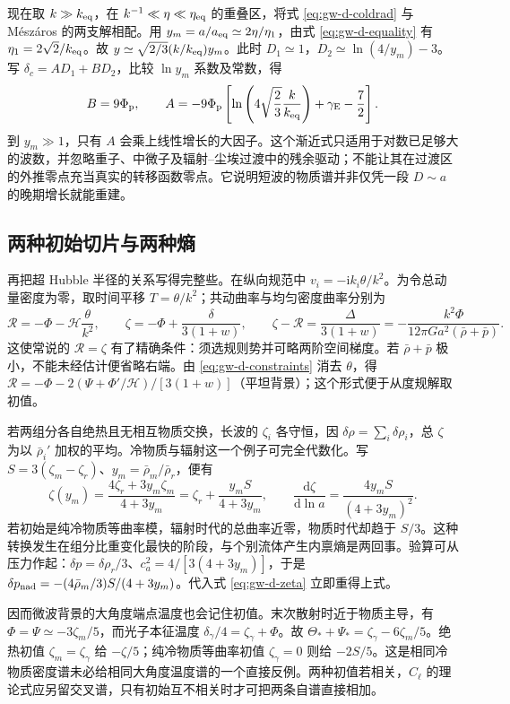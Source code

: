 现在取 $k\gg k_{\rm eq}$，在 $k^{-1}\ll\eta\ll\eta_{\rm eq}$ 的重叠区，将式 \eqref{eq:gw-d-coldrad} 与 Mészáros 的两支解相配。用 $y_m=a/a_{\rm eq}\simeq2\eta/\eta_1$，由式 \eqref{eq:gw-d-equality} 有 $\eta_1=2\sqrt2/k_{\rm eq}$。故 $y\simeq\sqrt{2/3}(k/k_{\rm eq})y_m$。此时 $D_1\simeq1$，$D_2\simeq\ln(4/y_m)-3$。写 $\delta_c=A D_1+B D_2$，比较 $\ln y_m$ 系数及常数，得
\[
 B=9\Phi_{\rm p},\qquad
 A=-9\Phi_{\rm p}
   \left[\ln\left(4\sqrt{\frac23}\frac{k}{k_{\rm eq}}\right)
   +\gamma_{\rm E}-\frac72\right].
\]
到 $y_m\gg1$，只有 $A$ 会乘上线性增长的大因子。这个渐近式只适用于对数已足够大的波数，并忽略重子、中微子及辐射--尘埃过渡中的残余驱动；不能让其在过渡区的外推零点充当真实的转移函数零点。它说明短波的物质谱并非仅凭一段 $D\sim a$ 的晚期增长就能重建。

\subsection{两种初始切片与两种熵}

再把超 Hubble 半径的关系写得完整些。在纵向规范中 $v_i=-\mathrm i k_i\theta/k^2$。为令总动量密度为零，取时间平移 $T=\theta/k^2$；共动曲率与均匀密度曲率分别为
\[
 \mathcal R=-\Phi-\mathcal H\frac{\theta}{k^2},\qquad
 \zeta=-\Phi+\frac{\delta}{3(1+w)},\qquad
 \zeta-\mathcal R=\frac{\Delta}{3(1+w)}
 =-\frac{k^2\Phi}{12\pi G a^2(\bar\rho+\bar p)} .
\]
这使常说的 $\mathcal R=\zeta$ 有了精确条件：须选规则势并可略两阶空间梯度。若 $\bar\rho+\bar p$ 极小，不能未经估计便省略右端。由 \eqref{eq:gw-d-constraints} 消去 $\theta$，得 $\mathcal R=-\Phi-2(\Psi+\Phi'/\mathcal H)/[3(1+w)]$（平坦背景）；这个形式便于从度规解取初值。

若两组分各自绝热且无相互物质交换，长波的 $\zeta_i$ 各守恒，因 $\delta\rho=\sum_i\delta\rho_i$，总 $\zeta$ 为以 $\bar\rho_i'$ 加权的平均。冷物质与辐射这一个例子可完全代数化。写 $S=3(\zeta_m-\zeta_r)$、$y_m=\bar\rho_m/\bar\rho_r$，便有
\[
 \zeta(y_m)=\frac{4\zeta_r+3y_m\zeta_m}{4+3y_m}
 =\zeta_r+\frac{y_m S}{4+3y_m},\qquad
 \frac{\mathrm d\zeta}{\mathrm d\ln a}=\frac{4y_m S}{(4+3y_m)^2}.
\]
若初始是纯冷物质等曲率模，辐射时代的总曲率近零，物质时代却趋于 $S/3$。这种转换发生在组分比重变化最快的阶段，与个别流体产生内禀熵是两回事。验算可从压力作起：$\delta p=\delta\rho_r/3$、$c_a^2=4/[3(4+3y_m)]$，于是 $\delta p_{\rm nad}=-(4\bar\rho_m/3)S/(4+3y_m)$。代入式 \eqref{eq:gw-d-zeta} 立即重得上式。

因而微波背景的大角度端点温度也会记住初值。末次散射时近于物质主导，有 $\Phi=\Psi\simeq-3\zeta_m/5$，而光子本征温度 $\delta_\gamma/4=\zeta_\gamma+\Phi$。故 $\Theta_*+\Psi_*=\zeta_\gamma-6\zeta_m/5$。绝热初值 $\zeta_m=\zeta_\gamma$ 给 $-\zeta/5$；纯冷物质等曲率初值 $\zeta_\gamma=0$ 则给 $-2S/5$。这是相同冷物质密度谱未必给相同大角度温度谱的一个直接反例。两种初值若相关，$C_\ell$ 的理论式应另留交叉谱，只有初始互不相关时才可把两条自谱直接相加。


